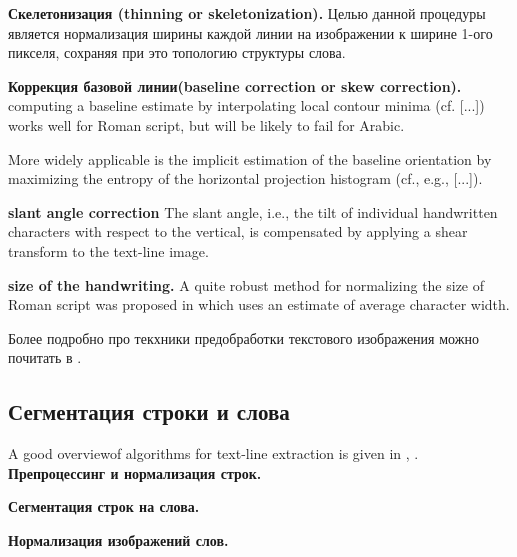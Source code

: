 \textbf{Скелетонизация (thinning or skeletonization).} Целью данной процедуры является нормализация ширины каждой линии на изображении к ширине 1-ого пикселя, сохраняя при это топологию структуры слова. \cite{suen1994thinning}

\textbf{Коррекция базовой линии(baseline correction or skew correction).} computing a baseline estimate by interpolating local contour minima (cf. [...]) works well for Roman script, but will be likely to fail for Arabic. \cite{plotz2009markov}

More widely applicable is the implicit estimation of the baseline orientation by maximizing the entropy of the horizontal projection histogram (cf., e.g., [...]). \cite{plotz2009markov}

\textbf{slant angle correction} The slant angle, i.e., the tilt of individual handwritten characters with respect to the vertical, is compensated by applying a shear transform to the text-line image. \cite{plotz2009markov}

\textbf{size of the handwriting.} A quite robust method for normalizing the size of Roman script was proposed in \cite{madhvanath1999chaincode} which uses an estimate of average character width.

Более подробно про текхники предобработки текстового изображения можно почитать в \cite{fujisawa2007robustness}.

\subsection{Сегментация строки и слова} \label{subsect4_2_3}

A good overviewof algorithms for text-line extraction is given in \cite{likforman2007text}, \cite{durebrandt2015segmentation}.
\textbf{Препроцессинг и нормализация строк.} \cite{durebrandt2015segmentation}

\textbf{Сегментация строк на слова.} \cite{durebrandt2015segmentation}

\textbf{Нормализация изображений слов.} \cite{durebrandt2015segmentation}
